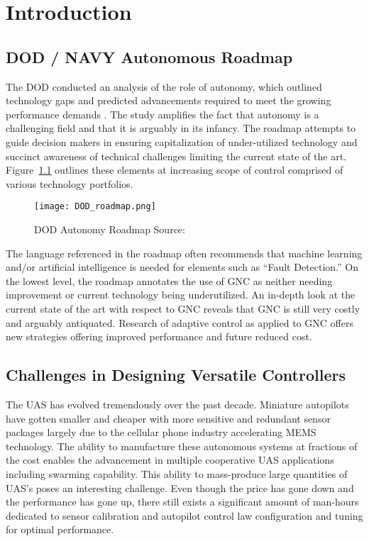 \chapter{Introduction}\label{ch:intro}

\section{DOD / NAVY Autonomous Roadmap}
The \ac{DOD} conducted an analysis of the role of autonomy, which outlined technology gaps and predicted advancements required to meet the growing performance demands \cite{dodroadmap}.  The study amplifies the fact that autonomy is a challenging field and that it is arguably in its infancy.  The roadmap attempts to guide decision makers in ensuring capitalization of under-utilized technology and succinct awareness of technical challenges limiting the current state of the art.  Figure~\ref{fig:dod_roadmap} outlines these elements at increasing scope of control comprised of various technology portfolios.  
\begin{figure}[h!]
 \centering
  \texttt{[image: DOD\_roadmap.png]}
  \caption{DOD Autonomy Roadmap Source:\cite{dodroadmap}}
  \label{fig:dod_roadmap}
\end{figure}
The language referenced in the roadmap often recommends that machine learning and/or artificial intelligence is needed for elements such as \enquote{Fault Detection.}  On the lowest level, the roadmap annotates the use of \ac{GNC} as neither needing improvement or current technology being underutilized.  An in-depth look at the current state of the art with respect to \ac{GNC} reveals that \ac{GNC} is still very costly and arguably antiquated.  Research of adaptive control as applied to \ac{GNC} offers new strategies offering improved performance and future reduced cost.

\section{Challenges in Designing Versatile Controllers}
The \ac{UAS} has evolved tremendously over the past decade.  Miniature autopilots have gotten smaller and cheaper with more sensitive and redundant sensor packages largely due to the cellular phone industry accelerating \ac{MEMS} technology.  The ability to manufacture these autonomous systems at fractions of the cost enables the advancement in multiple cooperative \ac{UAS} applications including swarming capability.  This ability to mass-produce large quantities of \ac{UAS}'s poses an interesting challenge.  Even though the price has gone down and the performance has gone up, there still exists a significant amount of man-hours dedicated to sensor calibration and autopilot control law configuration and tuning for optimal performance.  

